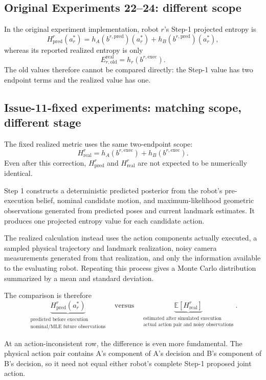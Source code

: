 \documentclass[11pt,a4paper]{article}
\newcommand{\hpose}[2]{h_{#1}\!\left(b^{#2}\right)}
\begin{document}
\subsection{Original Experiments 22--24: different scope}

In the original experiment implementation, robot $r$'s Step-1 projected
entropy is
\[
  H_{\mathrm{pred}}^r(a_r^*)
  =\hpose{A}{r,\mathrm{pred}}(a_r^*)
   +\hpose{B}{r,\mathrm{pred}}(a_r^*),
\]
whereas its reported realized entropy is only
\[
  E_{r,\mathrm{old}}^{\mathrm{real}}
  =\hpose{r}{r,\mathrm{exec}}.
\]
The old values therefore cannot be compared directly: the Step-1 value has
two endpoint terms and the realized value has one.

\subsection{Issue-11-fixed experiments: matching scope, different stage}

The fixed realized metric uses the same two-endpoint scope:
\[
  H_{\mathrm{real}}^r
  =\hpose{A}{r,\mathrm{exec}}+\hpose{B}{r,\mathrm{exec}}.
\]
Even after this correction, $H_{\mathrm{pred}}^r$ and
$H_{\mathrm{real}}^r$ are not expected to be numerically identical.

Step 1 constructs a deterministic predicted posterior from the robot's
pre-execution belief, nominal candidate motion, and maximum-likelihood
geometric observations generated from predicted poses and current landmark
estimates.  It produces one projected entropy value for each candidate action.

The realized calculation instead uses the action components actually executed,
a sampled physical trajectory and landmark realization, noisy camera
measurements generated from that realization, and only the information
available to the evaluating robot.  Repeating this process gives a Monte Carlo
distribution summarized by a mean and standard deviation.

The comparison is therefore
\[
  \underbrace{H_{\mathrm{pred}}^r(a_r^*)}_{
    \substack{\text{predicted before execution}\\
              \text{nominal/MLE future observations}}}
  \quad\text{versus}\quad
  \underbrace{\mathbb E\!\left[H_{\mathrm{real}}^r\right]}_{
    \substack{\text{estimated after simulated execution}\\
              \text{actual action pair and noisy observations}}}.
\]

At an action-inconsistent row, the difference is even more fundamental.  The
physical action pair contains A's component of A's decision and B's component
of B's decision, so it need not equal either robot's complete Step-1 proposed
joint action.
\end{document}
